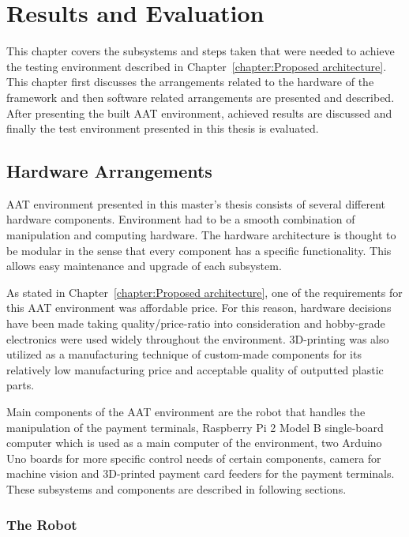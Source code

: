 
\chapter{Results and Evaluation}
\label{chapter:Results and Evaluation}

This chapter covers the subsystems and steps taken that were needed to achieve the testing environment described in Chapter~\ref{chapter:Proposed architecture}. This chapter first discusses the arrangements related to the hardware of the framework and then software related arrangements are presented and described. After presenting the built AAT environment, achieved results are discussed and finally the test environment presented in this thesis is evaluated.

\section{Hardware Arrangements}
\label{section:Hardware arrangements}

AAT environment presented in this master's thesis consists of several different hardware components. Environment had to be a smooth combination of manipulation and computing hardware. The hardware architecture is thought to be modular in the sense that every component has a specific functionality. This allows easy maintenance and upgrade of each subsystem.

As stated in Chapter~\ref{chapter:Proposed architecture}, one of the requirements for this AAT environment was affordable price. For this reason, hardware decisions have been made taking quality/price-ratio into consideration and hobby-grade electronics were used widely throughout the environment. 3D-printing was also utilized as a manufacturing technique of custom-made components for its relatively low manufacturing price and acceptable quality of outputted plastic parts.

Main components of the AAT environment are the robot that handles the manipulation of the payment terminals, Raspberry Pi 2 Model B single-board computer which is used as a main computer of the environment, two Arduino Uno boards for more specific control needs of certain components, camera for machine vision and 3D-printed payment card feeders for the payment terminals. These subsystems and components are described in following sections.

\subsection{The Robot}
\label{subsection:Robot}

